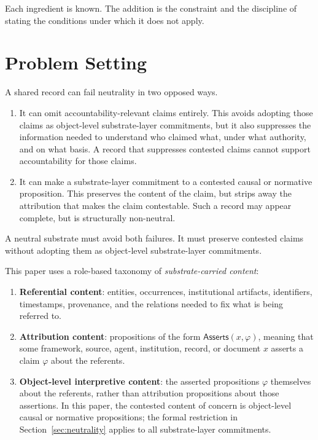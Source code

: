 \documentclass[11pt]{article}
\theoremstyle{plain}
\theoremstyle{definition}
\theoremstyle{remark}
\newcommand{\SecRef}[1]{Section~\ref{#1}}
\newcommand{\Asserts}{\mathsf{Asserts}}
\begin{document}
Each ingredient is known.
The addition is the constraint and the discipline of stating
the conditions under which it does not apply.

\section{Problem Setting}
\label{sec:problem-setting}

A shared record can fail neutrality in two opposed ways.

\begin{enumerate}
  \item It can omit accountability-relevant claims entirely.
        This avoids adopting those claims as object-level substrate-layer commitments,
        but it also suppresses the information needed to understand
        who claimed what, under what authority, and on what basis.
        A record that suppresses contested claims cannot support accountability
        for those claims.

  \item It can make a substrate-layer commitment
        to a contested causal or normative proposition.
        This preserves the content of the claim,
        but strips away the attribution that makes the claim contestable.
        Such a record may appear complete, but is structurally non-neutral.
\end{enumerate}

A neutral substrate must avoid both failures.
It must preserve contested claims without adopting them
as object-level substrate-layer commitments.

This paper uses a role-based taxonomy of \emph{substrate-carried content}:

\begin{enumerate}
  \item \textbf{Referential content}: entities, occurrences, institutional
        artifacts, identifiers, timestamps, provenance, and the relations needed
        to fix what is being referred to.
  \item \textbf{Attribution content}: propositions of the form
        $\Asserts(x,\varphi)$, meaning that some
        framework, source, agent, institution, record, or document $x$
        asserts a claim $\varphi$ about the referents.
  \item \textbf{Object-level interpretive content}: the asserted propositions
        $\varphi$ themselves about the referents, rather than attribution
        propositions about those assertions.
        In this paper, the contested content of concern
        is object-level causal or normative propositions;
        the formal restriction in \SecRef{sec:neutrality}
        applies to all substrate-layer commitments.
\end{enumerate}
\end{document}
